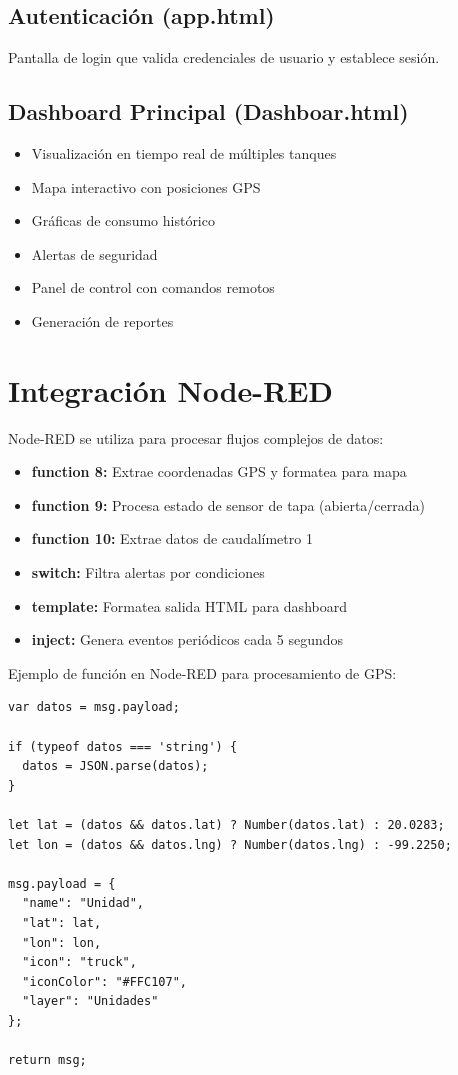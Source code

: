 \documentclass[12pt,a4paper,oneside]{report}
\begin{document}
\subsection{Autenticación (app.html)}

Pantalla de login que valida credenciales de usuario y establece sesión.

\subsection{Dashboard Principal (Dashboar.html)}

\begin{itemize}
    \item Visualización en tiempo real de múltiples tanques
    \item Mapa interactivo con posiciones GPS
    \item Gráficas de consumo histórico
    \item Alertas de seguridad
    \item Panel de control con comandos remotos
    \item Generación de reportes
\end{itemize}

\section{Integración Node-RED}

Node-RED se utiliza para procesar flujos complejos de datos:

\begin{itemize}
    \item \textbf{function 8:} Extrae coordenadas GPS y formatea para mapa
    \item \textbf{function 9:} Procesa estado de sensor de tapa (abierta/cerrada)
    \item \textbf{function 10:} Extrae datos de caudalímetro 1
    \item \textbf{switch:} Filtra alertas por condiciones
    \item \textbf{template:} Formatea salida HTML para dashboard
    \item \textbf{inject:} Genera eventos periódicos cada 5 segundos
\end{itemize}

Ejemplo de función en Node-RED para procesamiento de GPS:

\begin{lstlisting}
var datos = msg.payload;

if (typeof datos === 'string') {
  datos = JSON.parse(datos);
}

let lat = (datos && datos.lat) ? Number(datos.lat) : 20.0283;
let lon = (datos && datos.lng) ? Number(datos.lng) : -99.2250;

msg.payload = {
  "name": "Unidad",
  "lat": lat,
  "lon": lon,
  "icon": "truck",
  "iconColor": "#FFC107",
  "layer": "Unidades"
};

return msg;
\end{lstlisting}
\end{document}

